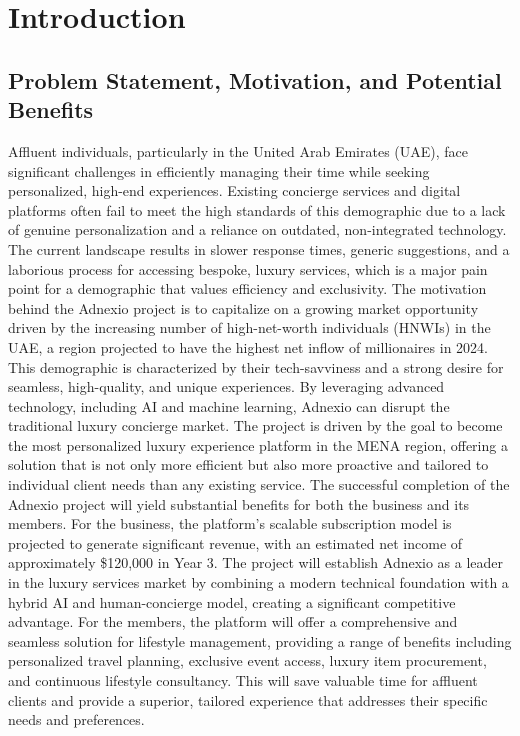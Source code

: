 \chapter{Introduction}
\label{chapter:Introduction}

\section{Problem Statement, Motivation, and Potential Benefits}

Affluent individuals, particularly in the United Arab Emirates (UAE), face significant challenges in efficiently managing their time while seeking personalized, high-end experiences. Existing concierge services and digital platforms often fail to meet the high standards of this demographic due to a lack of genuine personalization and a reliance on outdated, non-integrated technology. The current landscape results in slower response times, generic suggestions, and a laborious process for accessing bespoke, luxury services, which is a major pain point for a demographic that values efficiency and exclusivity.
The motivation behind the Adnexio project is to capitalize on a growing market opportunity driven by the increasing number of high-net-worth individuals (HNWIs) in the UAE, a region projected to have the highest net inflow of millionaires in 2024. This demographic is characterized by their tech-savviness and a strong desire for seamless, high-quality, and unique experiences. By leveraging advanced technology, including AI and machine learning, Adnexio can disrupt the traditional luxury concierge market. The project is driven by the goal to become the most personalized luxury experience platform in the MENA region, offering a solution that is not only more efficient but also more proactive and tailored to individual client needs than any existing service.
The successful completion of the Adnexio project will yield substantial benefits for both the business and its members. For the business, the platform's scalable subscription model is projected to generate significant revenue, with an estimated net income of approximately \$120,000 in Year 3. The project will establish Adnexio as a leader in the luxury services market by combining a modern technical foundation with a hybrid AI and human-concierge model, creating a significant competitive advantage. For the members, the platform will offer a comprehensive and seamless solution for lifestyle management, providing a range of benefits including personalized travel planning, exclusive event access, luxury item procurement, and continuous lifestyle consultancy. This will save valuable time for affluent clients and provide a superior, tailored experience that addresses their specific needs and preferences.


